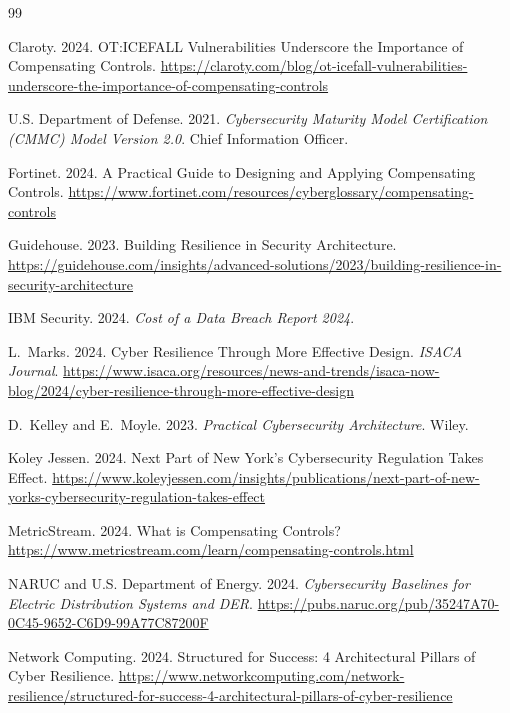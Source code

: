 \documentclass[sigconf,nonacm]{acmart}
\begin{document}
\sloppy

\begin{thebibliography}{99}

Claroty. 2024. OT:ICEFALL Vulnerabilities Underscore the Importance of Compensating
Controls.
\url{https://claroty.com/blog/ot-icefall-vulnerabilities-underscore-the-importance-of-compensating-controls}

U.S. Department of Defense. 2021. \textit{Cybersecurity Maturity Model Certification
(CMMC) Model Version 2.0}. Chief Information Officer.

Fortinet. 2024. A Practical Guide to Designing and Applying Compensating Controls.
\url{https://www.fortinet.com/resources/cyberglossary/compensating-controls}

Guidehouse. 2023. Building Resilience in Security Architecture.
\url{https://guidehouse.com/insights/advanced-solutions/2023/building-resilience-in-security-architecture}

IBM Security. 2024. \textit{Cost of a Data Breach Report 2024}.

L.~Marks. 2024. Cyber Resilience Through More Effective Design. \textit{ISACA Journal}.
\url{https://www.isaca.org/resources/news-and-trends/isaca-now-blog/2024/cyber-resilience-through-more-effective-design}

D.~Kelley and E.~Moyle. 2023. \textit{Practical Cybersecurity Architecture}. Wiley.

Koley Jessen. 2024. Next Part of New York's Cybersecurity Regulation Takes Effect.
\url{https://www.koleyjessen.com/insights/publications/next-part-of-new-yorks-cybersecurity-regulation-takes-effect}

MetricStream. 2024. What is Compensating Controls?
\url{https://www.metricstream.com/learn/compensating-controls.html}

NARUC and U.S. Department of Energy. 2024. \textit{Cybersecurity Baselines for Electric
Distribution Systems and DER}.
\url{https://pubs.naruc.org/pub/35247A70-0C45-9652-C6D9-99A77C87200F}

Network Computing. 2024. Structured for Success: 4 Architectural Pillars of Cyber
Resilience.
\url{https://www.networkcomputing.com/network-resilience/structured-for-success-4-architectural-pillars-of-cyber-resilience}


\end{thebibliography}
\end{document}
